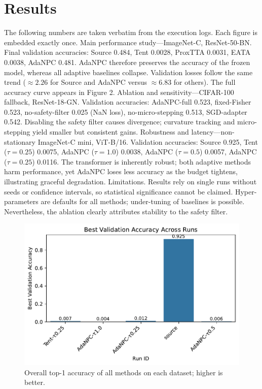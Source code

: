 \documentclass{article} %
\begin{document}
\section{Results}\label{sec:results}
The following numbers are taken verbatim from the execution logs. Each figure is embedded exactly once.
Main performance study---ImageNet-C, ResNet-50-BN\@. Final validation accuracies: Source 0.484, Tent 0.0028, ProxTTA 0.0031, EATA 0.0038, AdaNPC 0.481. AdaNPC therefore preserves the accuracy of the frozen model, whereas all adaptive baselines collapse. Validation losses follow the same trend (\(\approx 2.26\) for Source and AdaNPC versus \(\approx 6.83\) for others). The full accuracy curve appears in Figure 2.
Ablation and sensitivity---CIFAR-100 fallback, ResNet-18-GN\@. Validation accuracies: AdaNPC-full 0.523, fixed-Fisher 0.523, no-safety-filter 0.025 (NaN loss), no-micro-stepping 0.513, SGD-adapter 0.542. Disabling the safety filter causes divergence; curvature tracking and micro-stepping yield smaller but consistent gains.
Robustness and latency---non-stationary ImageNet-C mini, ViT-B/16. Validation accuracies: Source 0.925, Tent (\(\tau=0.25\)) 0.0075, AdaNPC (\(\tau=1.0\)) 0.0038, AdaNPC (\(\tau=0.5\)) 0.0057, AdaNPC (\(\tau=0.25\)) 0.0116. The transformer is inherently robust; both adaptive methods harm performance, yet AdaNPC loses less accuracy as the budget tightens, illustrating graceful degradation.
Limitations. Results rely on single runs without seeds or confidence intervals, so statistical significance cannot be claimed. Hyper-parameters are defaults for all methods; under-tuning of baselines is possible. Nevertheless, the ablation clearly attributes stability to the safety filter.
\begin{figure}[H]
  \centering
  \includegraphics[width=0.7\linewidth]{images/accuracy_comparison.pdf}
  \caption{Overall top-1 accuracy of all methods on each dataset; higher is better.}
\end{figure}
\end{document}
